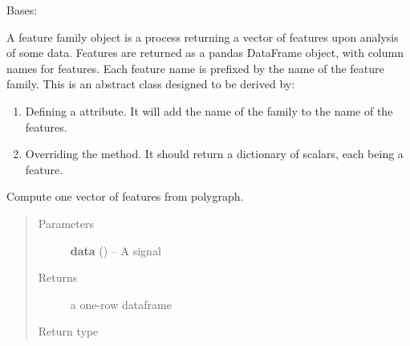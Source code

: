 \documentclass[letterpaper,10pt,english]{sphinxmanual}
\begin{document}
\begin{fulllineitems}
\label{pyrem.feature_families:pyrem.feature_families.FeatureFamilyBase}
Bases: 

A feature family object is a process returning a vector of features upon analysis of some data.
Features are returned as a pandas DataFrame object, with column names for features. Each feature name is prefixed by the name of the
feature family. This is an abstract class designed to be derived by:
\begin{enumerate}
\item {} 
Defining a  attribute. It will add the name of the family to the name of the features.

\item {} 
Overriding the  method. It should return a dictionary of scalars, each being a feature.

\end{enumerate}

\begin{fulllineitems}
\label{pyrem.feature_families:pyrem.feature_families.FeatureFamilyBase.make_vector}
Compute one vector of features from polygraph.
\begin{quote}\begin{description}
\item[{Parameters}] \leavevmode
\textbf{data} () -- A signal

\item[{Returns}] \leavevmode
a one-row dataframe

\item[{Return type}] \leavevmode
\href{http://pandas.pydata.org/pandas-docs/stable/generated/pandas.DataFrame.html\#pandas.DataFrame}{}

\end{description}\end{quote}

\end{fulllineitems}


\begin{fulllineitems}
\label{pyrem.feature_families:pyrem.feature_families.FeatureFamilyBase.prefix}
\end{fulllineitems}


\end{fulllineitems}
\end{document}
